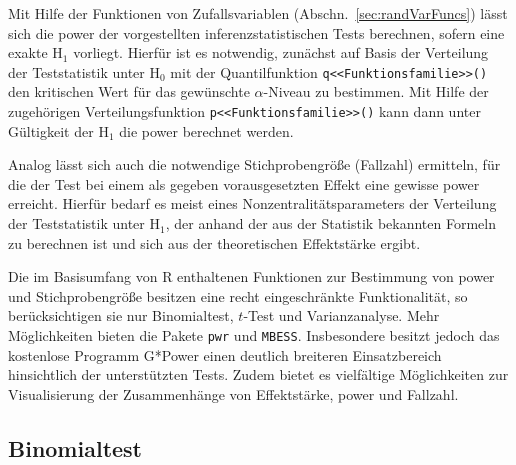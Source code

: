 Mit Hilfe der Funktionen von Zufallsvariablen (Abschn.\ \ref{sec:randVarFuncs}) lässt sich die power der vorgestellten inferenzstatistischen Tests berechnen, sofern eine exakte $\text{H}_{1}$ vorliegt. Hierfür ist es notwendig, zunächst auf Basis der Verteilung der Teststatistik unter $\text{H}_{0}$ mit der Quantilfunktion \lstinline!q<<Funktionsfamilie>>()! den kritischen Wert für das gewünschte $\alpha$-Niveau zu bestimmen. Mit Hilfe der zugehörigen Verteilungsfunktion \lstinline!p<<Funktionsfamilie>>()! kann dann unter Gültigkeit der $\text{H}_{1}$ die power berechnet werden.

Analog lässt sich auch die notwendige Stichprobengröße (Fallzahl) ermitteln, für die der Test bei einem als gegeben vorausgesetzten Effekt eine gewisse power erreicht. Hierfür bedarf es meist eines Nonzentralitätsparameters der Verteilung der Teststatistik unter $\text{H}_{1}$, der anhand der aus der Statistik bekannten Formeln zu berechnen ist und sich aus der theoretischen Effektstärke ergibt.

Die im Basisumfang von R enthaltenen Funktionen zur Bestimmung von power und Stichprobengröße besitzen eine recht eingeschränkte Funktionalität, so berücksichtigen sie nur Binomialtest, $t$-Test und Varianzanalyse. Mehr Möglichkeiten bieten die Pakete \lstinline!pwr! \cite{Champely2007} und \lstinline!MBESS!. Insbesondere besitzt jedoch das kostenlose Programm G*Power \cite{Faul2007} einen deutlich breiteren Einsatzbereich hinsichtlich der unterstützten Tests. Zudem bietet es vielfältige Möglichkeiten zur Visualisierung der Zusammenhänge von Effektstärke, power und Fallzahl.

\subsection{Binomialtest}

